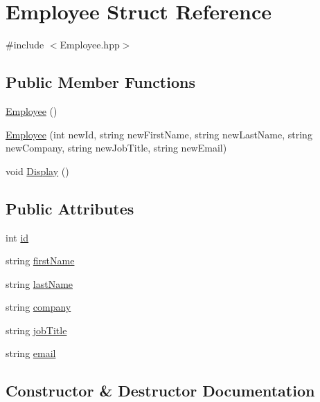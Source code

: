 \hypertarget{structEmployee}{}\section{Employee Struct Reference}
\label{structEmployee}


{\ttfamily \#include $<$Employee.\+hpp$>$}

\subsection*{Public Member Functions}
\begin{DoxyCompactItemize}
\item 
\hyperlink{structEmployee_a003c7bd08c40924e381eb0750cbb906f}{Employee} ()
\item 
\hyperlink{structEmployee_a06aaa6b1463dc93561ffd901c4bbc7f1}{Employee} (int new\+Id, string new\+First\+Name, string new\+Last\+Name, string new\+Company, string new\+Job\+Title, string new\+Email)
\item 
void \hyperlink{structEmployee_a577f83bdb0f1aeb3aa8d5e8166ad1e35}{Display} ()
\end{DoxyCompactItemize}
\subsection*{Public Attributes}
\begin{DoxyCompactItemize}
\item 
int \hyperlink{structEmployee_aa3c52ce29b149fa47f0edd9e998833f5}{id}
\item 
string \hyperlink{structEmployee_a29ffe329a053da230a3047d735b327c6}{first\+Name}
\item 
string \hyperlink{structEmployee_a267bc468161a6e5031bf03c6c3dcc27b}{last\+Name}
\item 
string \hyperlink{structEmployee_ab1205cf44ecd77432ac49d00024d29d8}{company}
\item 
string \hyperlink{structEmployee_a764e98a4988b58758cdeb8c805b67bc3}{job\+Title}
\item 
string \hyperlink{structEmployee_ad719e003fac9b1e8bb01fe7a59d3fbb2}{email}
\end{DoxyCompactItemize}


\subsection{Constructor \& Destructor Documentation}
